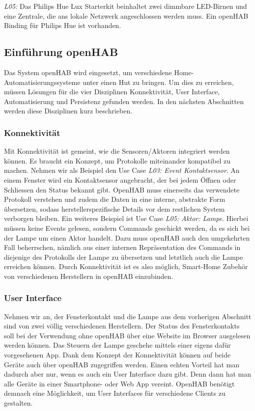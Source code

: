 \textit{L05:} Das Philips Hue Lux Starterkit beinhaltet zwei dimmbare LED-Birnen und eine Zentrale, die ans lokale Netzwerk angeschlossen werden muss. Ein openHAB Binding für Philips Hue ist vorhanden.

\subsection{Einführung openHAB}
Das System openHAB wird eingesetzt, um verschiedene Home-Automatisierungssysteme unter einen Hut zu bringen. Um dies zu erreichen, müssen Lösungen für die vier Disziplinen Konnektivität, User Interface, Automatisierung und Persistenz gefunden werden. In den nächsten Abschnitten werden diese Disziplinen kurz beschrieben.

\subsubsection{Konnektivität}
Mit Konnektivität ist gemeint, wie die Sensoren/Aktoren integriert werden können. Es braucht ein Konzept, um Protokolle miteinander kompatibel zu machen. Nehmen wir als Beispiel den Use Case \emph{L03: Event Kontaktsensor}. An einem Fenster wird ein Kontaktsensor angebracht, der bei jedem Öffnen oder Schliessen den Status bekannt gibt. OpenHAB muss einerseits das verwendete Protokoll verstehen und zudem die Daten in eine interne, abstrakte Form übersetzen, sodass herstellerspezifische Details vor dem restlichen System verborgen bleiben. Ein weiteres Beispiel ist Use Case \emph{L05: Aktor: Lampe}. Hierbei müssen keine Events gelesen, sondern Commands geschickt werden, da es sich bei der Lampe um einen Aktor handelt. Dazu muss openHAB auch den umgekehrten Fall beherrschen, nämlich aus einer internen Repräsentation des Commands in diejenige des Protokolls der Lampe zu übersetzen und letztlich auch die Lampe erreichen können. Durch Konnektivität ist es also möglich, Smart-Home Zubehör von verschiedenen Herstellern in openHAB einzubinden. 

\subsubsection{User Interface}
Nehmen wir an, der Fensterkontakt und die Lampe aus dem vorherigen Abschnitt sind von zwei völlig verschiedenen Herstellern. Der Status des Fensterkontakts soll bei der Verwendung ohne openHAB über eine Website im Browser ausgelesen werden können. Das Steuern der Lampe geschehe mittels einer eigens dafür vorgesehenen App. Dank dem Konzept der Konnektivität können auf beide Geräte auch über openHAB zugegriffen werden. Einen echten Vorteil hat man dadurch aber nur, wenn es auch ein User Interface dazu gibt. Denn dann hat man alle Geräte in einer Smartphone- oder Web App vereint. OpenHAB benötigt demnach eine Möglichkeit, um User Interfaces für verschiedene Clients zu gestalten.

